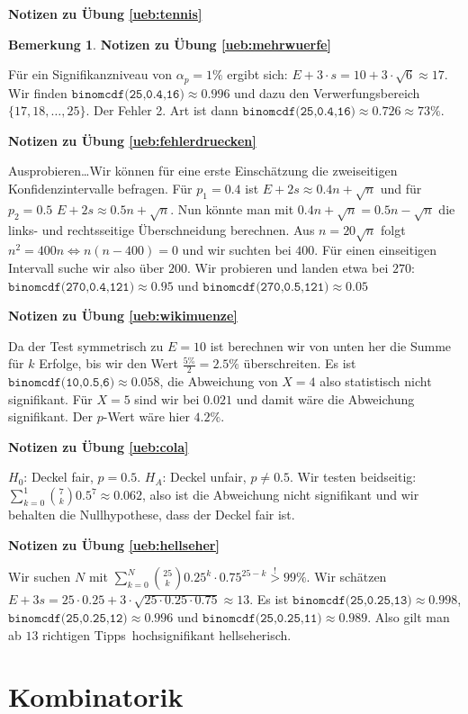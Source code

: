 \documentclass[%
<<<<<<< Updated upstream
11pt,%
twoside,%
titlepage,%
german,%
=======
11pt,%
twoside,%
titlepage,%
swissgerman,%
>>>>>>> Stashed changes
headsepline%
]{scrartcl}
\newcommand{\faReturnGray}{\textcolor{gray}{\faMailReply}} %
\theoremstyle{definition}
\newtheorem{bem}{Bemerkung}[subsection] %
\theoremstyle{plain}
\newcommand{\concatueb}[1]{ueb:#1}%
\newcommand{\concatlsg}[1]{lsg:#1}%
\newenvironment{lsg}[1]{%
    \par\noindent\textbf{Notizen zu Übung \ref{\concatueb{#1}}}\label{\concatlsg{#1}}
    \hfill\hyperref[\concatueb{#1}]{\faReturnGray}\par %
}{%
    \par%
}
\newcounter{theo}[section]\setcounter{theo}{0}
\newcommand{\concatueb}[1]{ueb:#1}%
\newcommand{\concatlsg}[1]{lsg:#1}%
\newenvironment{lsg}[1]{%
    \par\noindent\textbf{Notizen zu Übung \ref{\concatueb{#1}}.}%
    \label{\concatlsg{#1}}
}{%
    \par%
}
\begin{document}
\begin{lsg}{tennis}
\begin{bem}
\begin{lsg}{mehrwuerfe}
    Für ein Signifikanzniveau von $\alpha_p=1\%$ ergibt sich: $E+3\cdot s=10+3\cdot\sqrt{6}\approx17$. Wir finden $\texttt{binomcdf(25,0.4,16)}\approx0.996$ und dazu den Verwerfungsbereich $\{17,18,\dots,25\}$. Der Fehler 2. Art ist dann $\texttt{binomcdf(25,0.4,16)}\approx0.726\approx73\%$.
\end{lsg}
\begin{lsg}{fehlerdruecken}
    Ausprobieren\dots Wir können für eine erste Einschätzung die zweiseitigen Konfidenzintervalle befragen. Für $p_1=0.4$ ist $E+2s\approx0.4n+\sqrt{n}$ und für $p_2=0.5$ $E+2s\approx0.5n+\sqrt{n}$. Nun könnte man mit $0.4n+\sqrt{n}=0.5n-\sqrt{n}$ die links- und rechtsseitige Überschneidung berechnen. Aus $n=20\sqrt{n}$ folgt $n^2=400n\Leftrightarrow n(n-400)=0$ und wir suchten bei $400$. Für einen einseitigen Intervall suche wir also über $200$. Wir probieren und landen etwa bei $270$: $\texttt{binomcdf(270,0.4,121)}\approx0.95$ und $\texttt{binomcdf(270,0.5,121)}\approx0.05$
\end{lsg}
\begin{lsg}{wikimuenze}
    Da der Test symmetrisch zu $E=10$ ist berechnen wir von unten her die Summe für $k$ Erfolge, bis wir den Wert $\frac{5\%}{2}=2.5\%$ überschreiten. Es ist $\texttt{binomcdf(10,0.5,6)}\approx0.058$, die Abweichung von $X=4$ also statistisch nicht signifikant. Für $X=5$ sind wir bei $0.021$ und damit wäre die Abweichung signifikant. Der $p$-Wert wäre hier $4.2\%$.
\end{lsg}
\begin{lsg}{cola}
    $H_0$: Deckel fair, $p=0.5$. $H_A$: Deckel unfair, $p\neq0.5$. Wir testen beidseitig: $\sum_{k=0}^1\binom{7}{k}0.5^7\approx0.062$, also ist die Abweichung nicht signifikant und wir behalten die Nullhypothese, dass der Deckel fair ist.
\end{lsg}
\begin{lsg}{hellseher}
    Wir suchen $N$ mit $\sum_{k=0}^N\binom{25}{k}0.25^k\cdot0.75^{25-k}\stackrel{!}{>}99\%$. Wir schätzen $E+3s=25\cdot0.25+3\cdot\sqrt{25\cdot0.25\cdot0.75}\approx13$. Es ist $\texttt{binomcdf(25,0.25,13)}\approx0.998$, $\texttt{binomcdf(25,0.25,12)}\approx0.996$ und $\texttt{binomcdf(25,0.25,11)}\approx0.989$. Also gilt man ab $13$ richtigen \glqq Tipps\grqq\ hochsignifikant hellseherisch.
\end{lsg}

\clearpage

\appendix

\section{Kombinatorik}

\end{bem}
\end{lsg}
\end{document}
